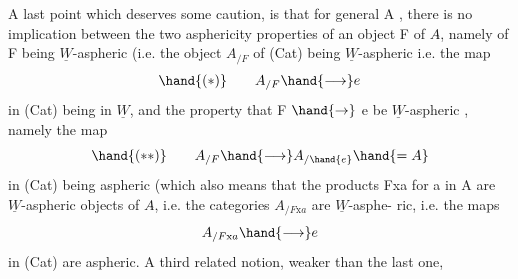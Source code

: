 A last point which deserves some caution, is that for general A ,
there is no implication between the  two asphericity properties of
an object F of $A\hat{}$, namely of F being $\underline{W}$-aspheric (i.e. the object $A_{/F}$ of
(Cat) being $\underline{W}$-aspheric\xout{)}\hand{,} i.e. the map 
\[ \hand{(*)} \qquad A_{/F} \hand{\longrightarrow} e \]
in (Cat) being in $\underline{W}$\hand{)}, and the property that F $\hand{\to}$ e be $\underline{W}$-aspheric ,
namely the map
\[ \hand{(**)} \qquad A_{/F} \hand{\longrightarrow} A_{/\hand{e}}\hand{= A} \]
in (Cat) being aspheric (which also means that the products Fxa for a
in A are $\underline{W}$-aspheric objects of $A\hat{}$, i.e. the categories $A_{/F\mathrm{x}a}$ are $\underline{W}$-asphe-%
ric, i.e. the maps
\[ A_{/F\mathrm{x}a} \hand{\longrightarrow} e \]
in (Cat) are aspheric\hand{)}. A third related notion, weaker than the last one,

